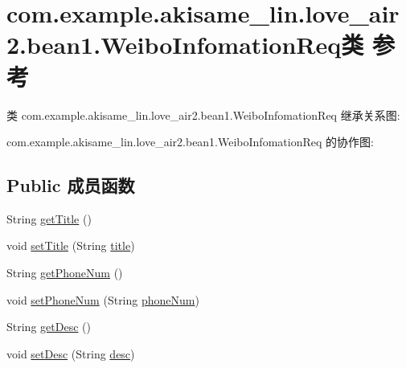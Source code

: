 \hypertarget{classcom_1_1example_1_1akisame__lin_1_1love__air2_1_1bean1_1_1_weibo_infomation_req}{}\section{com.\+example.\+akisame\+\_\+lin.\+love\+\_\+air2.\+bean1.\+Weibo\+Infomation\+Req类 参考}
\label{classcom_1_1example_1_1akisame__lin_1_1love__air2_1_1bean1_1_1_weibo_infomation_req}


类 com.\+example.\+akisame\+\_\+lin.\+love\+\_\+air2.\+bean1.\+Weibo\+Infomation\+Req 继承关系图\+:


com.\+example.\+akisame\+\_\+lin.\+love\+\_\+air2.\+bean1.\+Weibo\+Infomation\+Req 的协作图\+:
\subsection*{Public 成员函数}
\begin{DoxyCompactItemize}
\item 
String \mbox{\hyperlink{classcom_1_1example_1_1akisame__lin_1_1love__air2_1_1bean1_1_1_weibo_infomation_req_a37719177f09247d23fff29d2177f2496}{get\+Title}} ()
\item 
void \mbox{\hyperlink{classcom_1_1example_1_1akisame__lin_1_1love__air2_1_1bean1_1_1_weibo_infomation_req_a7b5df6949bdf45f4351e162b12bdb699}{set\+Title}} (String \mbox{\hyperlink{classcom_1_1example_1_1akisame__lin_1_1love__air2_1_1bean1_1_1_weibo_infomation_req_a1483e7293ba0d91b5622854fd771e0b8}{title}})
\item 
String \mbox{\hyperlink{classcom_1_1example_1_1akisame__lin_1_1love__air2_1_1bean1_1_1_weibo_infomation_req_aa3a80df57ffabafe5b8158b85b36a490}{get\+Phone\+Num}} ()
\item 
void \mbox{\hyperlink{classcom_1_1example_1_1akisame__lin_1_1love__air2_1_1bean1_1_1_weibo_infomation_req_a1b6c9eb030cf3ce037a8a69dd4b938de}{set\+Phone\+Num}} (String \mbox{\hyperlink{classcom_1_1example_1_1akisame__lin_1_1love__air2_1_1bean1_1_1_weibo_infomation_req_ad7f7a2b2c02f6116193f68991a2ddfee}{phone\+Num}})
\item 
String \mbox{\hyperlink{classcom_1_1example_1_1akisame__lin_1_1love__air2_1_1bean1_1_1_weibo_infomation_req_acb27ea114609a6d33cdab9ef9b9e9aa7}{get\+Desc}} ()
\item 
void \mbox{\hyperlink{classcom_1_1example_1_1akisame__lin_1_1love__air2_1_1bean1_1_1_weibo_infomation_req_a2965b6cd62590828f9997f2021414855}{set\+Desc}} (String \mbox{\hyperlink{classcom_1_1example_1_1akisame__lin_1_1love__air2_1_1bean1_1_1_weibo_infomation_req_a3f161379e3449060e9ac2322680e58b9}{desc}})
\end{DoxyCompactItemize}
